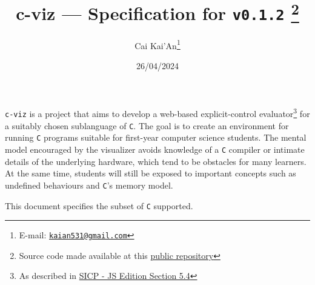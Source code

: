 \documentclass[11pt]{article}
\title{%
  \textsf{c-viz} --- Specification for \texttt{v0.1.2}%
  \footnote{Source code made available at this \href{https://github.com/caipng/c-viz/releases/tag/v0.1.2}{public repository}}}
\author{Cai Kai'An\footnote{E-mail: %
  \href{mailto:kaian531@gmail.com}{\texttt{kaian531@gmail.com}}}}
\date{26/04/2024}
\begin{document}
\maketitle

\vfill

\verb|c-viz| is a project that aims to develop a web-based explicit-control evaluator\footnote{As described in \href{https://sourceacademy.org/sicpjs/5.4}{SICP - JS Edition Section 5.4}} for a suitably chosen sublanguage of \verb|C|.
The goal is to create an environment for running \verb|C| programs suitable for first-year computer science students.
The mental model encouraged by the visualizer avoids knowledge of a \verb|C| compiler or intimate details of the underlying hardware, which tend to be obstacles for many learners.
At the same time, students will still be exposed to important concepts such as undefined behaviours and \verb|C|'s memory model.
\par
\medskip
This document specifies the subset of \verb|C| supported.

\begingroup
  \hypersetup{hidelinks}
  \tableofcontents
\endgroup











\appendix

% 
\end{document}
